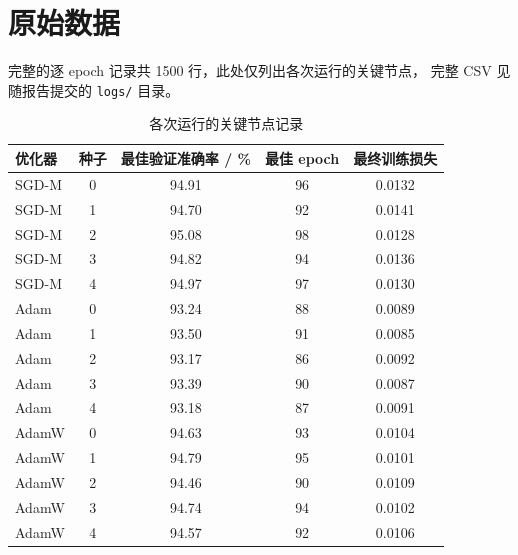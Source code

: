 
\section{原始数据}
\label{app:rawdata}

完整的逐 epoch 记录共 \num{1500} 行，此处仅列出各次运行的关键节点，
完整 CSV 见随报告提交的 \texttt{logs/} 目录。

\begin{table}[htbp]
  \centering
  \caption{各次运行的关键节点记录}
  \label{tab:app-raw}
  \begin{tabular}{l c
                  S[table-format=2.2]
                  S[table-format=3.0]
                  S[table-format=1.4]}
    \toprule
    {优化器} & {种子} & {最佳验证准确率 / \%} & {最佳 epoch} & {最终训练损失} \\
    \midrule
    SGD-M & 0 & 94.91 & 96 & 0.0132 \\
    SGD-M & 1 & 94.70 & 92 & 0.0141 \\
    SGD-M & 2 & 95.08 & 98 & 0.0128 \\
    SGD-M & 3 & 94.82 & 94 & 0.0136 \\
    SGD-M & 4 & 94.97 & 97 & 0.0130 \\
    \midrule
    Adam  & 0 & 93.24 & 88 & 0.0089 \\
    Adam  & 1 & 93.50 & 91 & 0.0085 \\
    Adam  & 2 & 93.17 & 86 & 0.0092 \\
    Adam  & 3 & 93.39 & 90 & 0.0087 \\
    Adam  & 4 & 93.18 & 87 & 0.0091 \\
    \midrule
    AdamW & 0 & 94.63 & 93 & 0.0104 \\
    AdamW & 1 & 94.79 & 95 & 0.0101 \\
    AdamW & 2 & 94.46 & 90 & 0.0109 \\
    AdamW & 3 & 94.74 & 94 & 0.0102 \\
    AdamW & 4 & 94.57 & 92 & 0.0106 \\
    \bottomrule
  \end{tabular}
\end{table}

